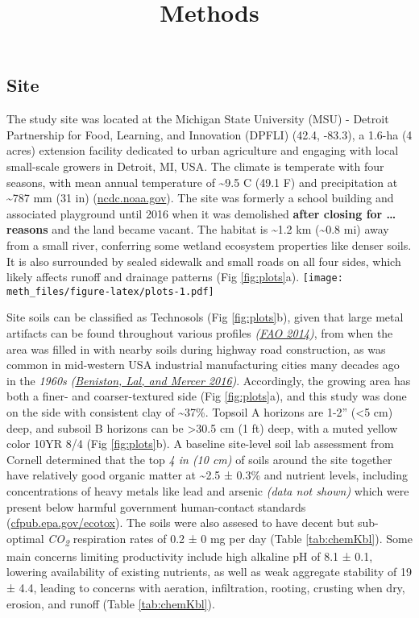 \documentclass[
]{article}
\title{Methods}
\author{}
\date{\vspace{-2.5em}}
\begin{document}
\maketitle

\hypertarget{site}{%
\subsection{Site}\label{site}}

The study site was located at the Michigan State University (MSU) - Detroit Partnership for Food, Learning, and Innovation (DPFLI) (42.4, -83.3), a 1.6-ha (4 acres) extension facility dedicated to urban agriculture and engaging with local small-scale growers in Detroit, MI, USA.
The climate is temperate with four seasons, with mean annual temperature of \textasciitilde9.5 C (49.1 F) and precipitation at \textasciitilde787 mm (31 in) (\url{ncdc.noaa.gov}).
The site was formerly a school building and associated playground until 2016 when it was demolished \textbf{after closing for \ldots{} reasons} and the land became vacant.
The habitat is \textasciitilde1.2 km (\textasciitilde0.8 mi) away from a small river, conferring some wetland ecosystem properties like denser soils.
It is also surrounded by sealed sidewalk and small roads on all four sides, which likely affects runoff and drainage patterns (Fig \ref{fig:plots}a).
\texttt{[image: meth\_files/figure-latex/plots-1.pdf]}

Site soils can be classified as Technosols (Fig \ref{fig:plots}b), given that large metal artifacts can be found throughout various profiles \emph{(\protect\hyperlink{ref-fao14}{FAO 2014})}, from when the area was filled in with nearby soils during highway road construction, as was common in mid-western USA industrial manufacturing cities many decades ago in the \emph{1960s} \emph{(\protect\hyperlink{ref-beniston16}{Beniston, Lal, and Mercer 2016})}.
Accordingly, the growing area has both a finer- and coarser-textured side (Fig \ref{fig:plots}a),
and this study was done on the side with consistent clay of \textasciitilde37\%.
Topsoil A horizons are 1-2'' (\textless5 cm) deep, and subsoil B horizons can be \textgreater30.5 cm (1 ft) deep, with a muted yellow color 10YR 8/4 (Fig \ref{fig:plots}b).
A baseline site-level soil lab assessment from Cornell determined that the top \emph{4 in (10 cm)} of soils around the site together have relatively good organic matter at
\textasciitilde2.5 ±
0.3\%
and nutrient levels, including concentrations of heavy metals like lead and arsenic \emph{(data not shown)} which were present below harmful government human-contact standards (\url{cfpub.epa.gov/ecotox}).
The soils were also assesed to have decent but sub-optimal \emph{CO\textsubscript{2}} respiration rates of
0.2 ±
0 mg per day
(Table \ref{tab:chemKbl}).
Some main concerns limiting productivity include high alkaline pH of
8.1 ±
0.1,
lowering availability of existing nutrients, as well as weak aggregate stability of
19 ±
4.4,
leading to concerns with aeration, infiltration, rooting, crusting when dry, erosion, and runoff (Table \ref{tab:chemKbl}).
\end{document}
